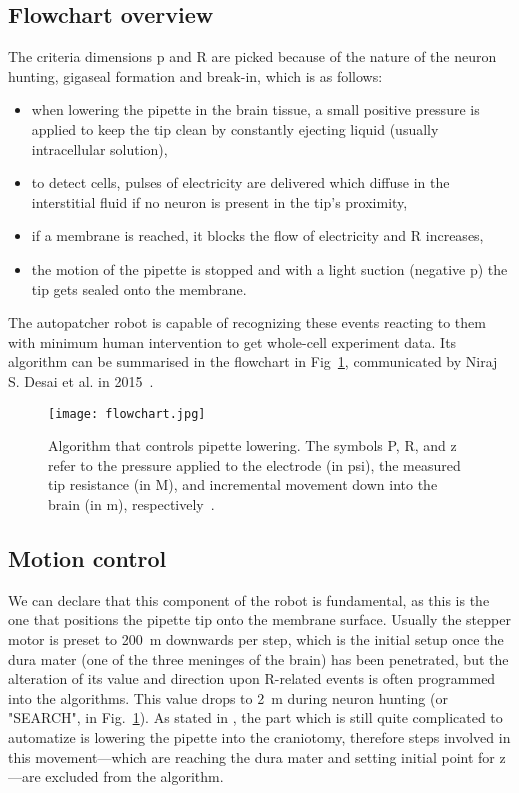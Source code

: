 \documentclass[12pt,a4paper]{report}
\begin{document}
\subsection{Flowchart overview}
The criteria dimensions p and R are picked because of the nature of the neuron hunting, gigaseal formation and break-in, which is as follows:
\begin{itemize}
    \item when lowering the pipette in the brain tissue, a small positive pressure is applied to keep the tip clean by constantly ejecting liquid (usually intracellular solution),
    \item to detect cells, pulses of electricity are delivered which diffuse in the interstitial fluid if no neuron is present in the tip's proximity,
    \item if a membrane is reached, it blocks the flow of electricity and R increases,
    \item the motion of the pipette is stopped and with a light suction (negative p) the tip gets sealed onto the membrane.
\end{itemize}
\par
The autopatcher robot is capable of recognizing these events reacting to them with minimum human intervention to get whole-cell experiment data. Its algorithm can be summarised in the flowchart in Fig~\ref{fig:flowchart}, communicated by Niraj S. Desai et al. in 2015~\cite{desai2015}.
\begin{figure}
    \centering
    \texttt{[image: flowchart.jpg]}
    \caption{Algorithm that controls pipette lowering. The symbols P, R, and \textDelta z refer to the pressure applied to the electrode (in psi), the measured tip resistance (in M\textOmega), and incremental movement down into the brain (in \textmu m), respectively~\cite{desai2015}.}
    \label{fig:flowchart}
\end{figure}

\subsection{Motion control}

We can declare that this component of the robot is fundamental, as this is the one that positions the pipette tip onto the membrane surface. Usually the stepper motor is preset to 200~\textmu m downwards per step, which is the initial setup once the dura mater (one of the three meninges of the brain) has been penetrated, but the alteration of its value and direction upon R-related events is often programmed into the algorithms. This value drops to 2~\textmu m during neuron hunting (or "SEARCH", in Fig.~\ref{fig:flowchart}). As stated in \cite{desai2015}, the part which is still quite complicated to automatize is lowering the pipette into the craniotomy, therefore steps involved in this movement---which are reaching the dura mater and setting initial point for z---are excluded from the algorithm.
\end{document}
